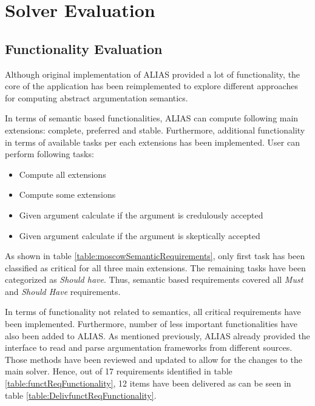 \section{Solver Evaluation}

\subsection{Functionality Evaluation}
Although original implementation of ALIAS provided a lot of functionality, the core of the application has been reimplemented to explore different approaches for computing abstract argumentation semantics. 

In terms of semantic based functionalities, ALIAS can compute following main extensions: complete, preferred and stable. Furthermore, additional functionality in terms of available tasks per each extensions has been implemented. User can perform following tasks:
\begin{itemize}
	\item Compute all extensions
	\item Compute some extensions
	\item Given argument calculate if the argument is credulously accepted 
	\item Given argument calculate if the argument is skeptically accepted
\end{itemize}

As shown in table \ref{table:moscowSemanticRequirements}, only first task has been classified as critical for all three main extensions. The remaining tasks have been categorized as \textit{Should have}. Thus, semantic based requirements covered all \textit{Must} and \textit{Should Have} requirements.

In terms of functionality not related to semantics, all critical requirements have been implemented. Furthermore, number of less important functionalities have also been added to ALIAS. As mentioned previously, ALIAS already provided the interface to read and parse argumentation frameworks from different sources. Those methods have been reviewed and updated to allow for the changes to the main solver. Hence, out of 17 requirements identified in table \ref{table:functReqFunctionality}, 12 items have been delivered as can be seen in table \ref{table:DelivfunctReqFunctionality}.

